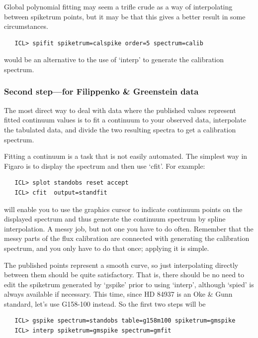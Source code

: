 \documentclass[11pt,twoside]{article}
\newcommand{\latorhtm}[2]{#1}
\newcommand{\latorhtm}[2]{#2}
\begin{document}
   Global polynomial fitting may seem a trifle crude as a way of
   interpolating between spiketrum points, but it may be that this gives
   a better result in some circumstances.

\begin{verbatim}
   ICL> spifit spiketrum=calspike order=5 spectrum=calib
\end{verbatim}

   would be an alternative to the use of `interp' to generate the
   calibration spectrum.


\subsubsection{\label{techno5fgsecond}Second step\latorhtm{---}{-}for
   Filippenko \& Greenstein data}

   The most direct way to deal with data where the published values
   represent fitted continuum values is to fit a continuum to your
   observed data, interpolate the tabulated data, and divide the two
   resulting spectra to get a calibration spectrum.

   Fitting a continuum is a task that is not easily automated.  The
   simplest way in Figaro is to display the spectrum and then use `cfit'.
   For example:

\begin{verbatim}
   ICL> splot standobs reset accept
   ICL> cfit  output=standfit
\end{verbatim}

   will enable you to use the graphics cursor to indicate continuum
   points on the displayed spectrum and thus generate the continuum
   spectrum by spline interpolation.  A messy job, but not one you have
   to do often. Remember that the messy parts of the flux calibration
   are connected with generating the calibration spectrum, and you only
   have to do that once; applying it is simple.

   The published points represent a smooth curve, so just interpolating
   directly between them should be quite satisfactory.  That is, there
   should be no need to edit the spiketrum generated by `gspike' prior
   to using `interp', although `spied' is always available if necessary.
   This time, since HD 84937 is an Oke \& Gunn standard, let's use
   G158-100 instead.  So the first two steps will be

\begin{verbatim}
   ICL> gspike spectrum=standobs table=g158m100 spiketrum=gmspike
   ICL> interp spiketrum=gmspike spectrum=gmfit
\end{verbatim}
\end{document}
